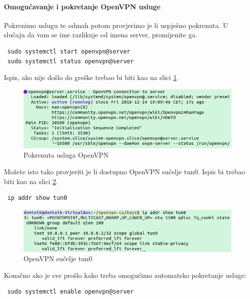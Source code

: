 \paragraph*{Omogućavanje i pokretanje OpenVPN usluge}
\hfill \smallbreak
Pokrenimo uslugu te odmah potom provjerimo je li uspješno pokrenuta. U slučaju da vam se ime razlikuje od imena server, promijenite ga.
\begin{lstlisting}
 sudo systemctl start openvpn@server
 sudo systemctl status openvpn@server
\end{lstlisting}
Ispis, ako nije došlo do greške trebao bi biti kao na slici \ref{fig:screenshot-from-2018-12-14-19-10-10}.
\begin{figure}[h]
	\centering
	\includegraphics[width=0.7\linewidth]{"slike/OpenVPN/Screenshot from 2018-12-14 19-10-10"}
	\caption[Pokrenuta usluga OpenVPN]{Pokrenuta usluga OpenVPN}
	\label{fig:screenshot-from-2018-12-14-19-10-10}
\end{figure}
Možete isto tako provjeriti je li dostupno OpenVPN sučelje tun0. Ispis bi trebao biti kao na slici \ref{fig:screenshot-from-2018-12-14-19-11-00}.
\begin{lstlisting}
 ip addr show tun0
\end{lstlisting}
\begin{figure}[h]
	\centering
	\includegraphics[width=0.7\linewidth]{"slike/OpenVPN/Screenshot from 2018-12-14 19-11-00"}
	\caption[OpenVPN sučelje tun0]{OpenVPN sučelje tun0}
	\label{fig:screenshot-from-2018-12-14-19-11-00}
\end{figure}
Konačno ako je sve prošlo kako treba omogućimo automatsko pokretanje usluge:
\begin{lstlisting}
 sudo systemctl enable openvpn@server
\end{lstlisting}
\bigbreak
